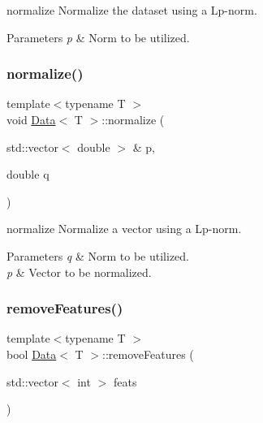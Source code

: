 normalize Normalize the dataset using a Lp-\/norm. 


\begin{DoxyParams}{Parameters}
{\em p} & Norm to be utilized. \\
\hline
\end{DoxyParams}
\mbox{\label{class_data_ad5c41d33e1de7531b952d6f33b7eca90}} 
\subsubsection{\texorpdfstring{normalize()}{normalize()}\hspace{0.1cm}{\footnotesize\ttfamily [2/2]}}
{\footnotesize\ttfamily template$<$typename T $>$ \\
void \hyperlink{class_data}{Data}$<$ T $>$\+::normalize (\begin{DoxyParamCaption}\item[{std\+::vector$<$ double $>$ \&}]{p,  }\item[{double}]{q }\end{DoxyParamCaption})\hspace{0.3cm}{\ttfamily [static]}}



normalize Normalize a vector using a Lp-\/norm. 


\begin{DoxyParams}{Parameters}
{\em q} & Norm to be utilized. \\
\hline
{\em p} & Vector to be normalized. \\
\hline
\end{DoxyParams}
\mbox{\label{class_data_a574b881ce5042c5a13d79c187aa3f923}} 
\subsubsection{\texorpdfstring{remove\+Features()}{removeFeatures()}}
{\footnotesize\ttfamily template$<$typename T $>$ \\
bool \hyperlink{class_data}{Data}$<$ T $>$\+::remove\+Features (\begin{DoxyParamCaption}\item[{std\+::vector$<$ int $>$}]{feats }\end{DoxyParamCaption})}



